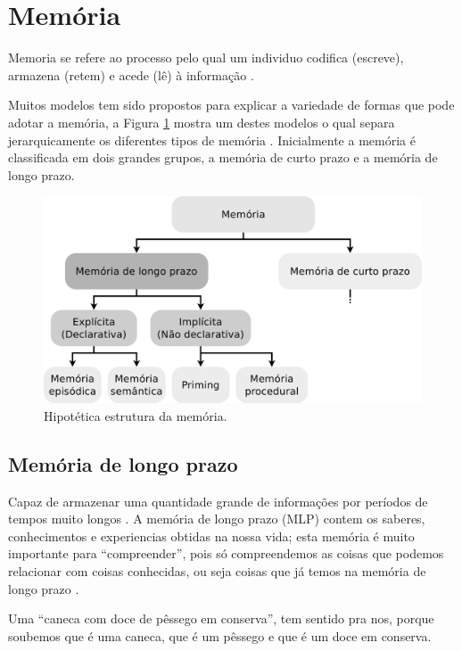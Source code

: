 \section{Memória}
\label{sec:memoria}

Memoria se refere ao processo pelo qual um individuo codifica (escreve), 
armazena (retem) e acede (lê) à informação
\cite[pp. 678]{spreen2006compendium} \cite[pp. 31]{de2000comprension}.

Muitos modelos tem sido propostos para explicar a variedade de formas 
que pode adotar a memória, a Figura \ref{fig:memory-clasification}  mostra um destes modelos
o qual separa jerarquicamente os diferentes tipos de memória
\cite[pp. 678]{spreen2006compendium}.
Inicialmente a memória é classificada em dois grandes grupos,
a memória de curto prazo e a memória de longo prazo.
\begin{figure}[!h]
  \centering
    \includegraphics[width=\textwidth]{chapters/cap-learning/memory-clasification.eps} 
  \caption{Hipotética estrutura da memória.}
\label{fig:memory-clasification}
\end{figure}


\subsection{Memória de longo prazo} 
\label{sec:memoria:longo}
Capaz de armazenar uma quantidade grande de informações 
por períodos de tempos muito longos \cite[pp. 158]{sternbergpsicologia}.
A memória de longo prazo (MLP) contem os saberes, conhecimentos e experiencias obtidas na nossa vida;
esta memória é muito importante para ``compreender'',
pois só compreendemos as coisas que podemos relacionar com coisas conhecidas,
ou seja coisas que já temos na memória de longo prazo \cite[pp. 34]{de2000comprension}.
\begin{example}
Uma ``caneca com doce de pêssego em conserva'', tem sentido pra nos,
porque soubemos que é uma caneca, que é um pêssego e que é um doce em conserva.
\end{example} 

